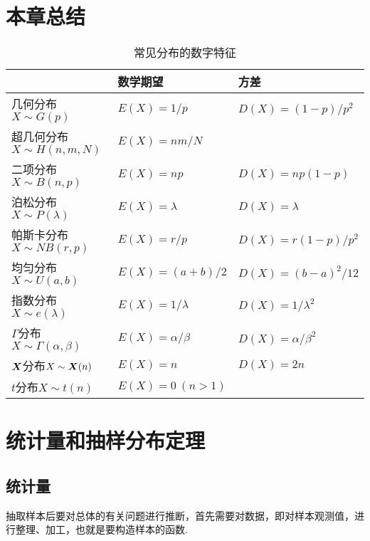 \section{本章总结}
\begin{table}[ht]
	\centering
	\begin{tabular}{p{3.5cm}|p{4cm}p{4cm}}
		\hline
		& 数学期望 & 方差 \\ \hline
		几何分布\newline\(X \sim G(p)\)
			& \(E(X) = 1/p\)
			& \(D(X) = (1-p)/p^2\) \\ \hline
		超几何分布\newline\(X \sim H(n,m,N)\)
			& \(E(X) = nm/N\) \\ \hline
		二项分布\newline\(X \sim B(n,p)\)
			& \(E(X) = np\)
			& \(D(X) = np(1-p)\) \\ \hline
		泊松分布\newline\(X \sim P(\lambda)\)
			& \(E(X) = \lambda\)
			& \(D(X) = \lambda\) \\ \hline
		帕斯卡分布\newline\(X \sim NB(r,p)\)
			& \(E(X) = r/p\)
			& \(D(X) = r(1-p)/p^2\) \\ \hline
		均匀分布\newline\(X \sim U(a,b)\)
			& \(E(X) = (a+b)/2\)
			& \(D(X) = (b-a)^2/12\) \\ \hline
		指数分布\newline\(X \sim e(\lambda)\)
			& \(E(X) = 1/\lambda\)
			& \(D(X) = 1/\lambda^2\) \\ \hline
		\(\Gamma\)分布\newline\(X \sim \Gamma(\alpha,\beta)\)
			& \(E(X) = \alpha/\beta\)
			& \(D(X) = \alpha/\beta^2\) \\ \hline
		\(\boldsymbol{X}\)分布\newline\(X \sim \boldsymbol{X}(n)\)
			& \(E(X) = n\)
			& \(D(X) = 2n\) \\ \hline
		\(t\)分布\newline\(X \sim t(n)\)
			& \(E(X) = 0\ (n>1)\) \\ \hline
	\end{tabular}
	\caption{常见分布的数字特征}
\end{table}

\section{统计量和抽样分布定理}
\subsection{统计量}
抽取样本后要对总体的有关问题进行推断，首先需要对数据，即对样本观测值，进行整理、加工，也就是要构造样本的函数.

